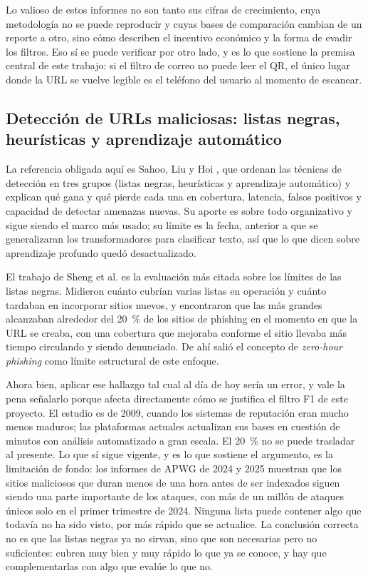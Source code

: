 Lo valioso de estos informes no son tanto sus cifras de crecimiento, cuya
metodología no se puede reproducir y cuyas bases de comparación cambian de un reporte a
otro, sino cómo describen el incentivo económico y la forma de evadir los filtros. Eso
sí se puede verificar por otro lado, y es lo que sostiene la premisa central de este
trabajo: si el filtro de correo no puede leer el QR, el único lugar donde la URL se
vuelve legible es el teléfono del usuario al momento de escanear.

\subsection{Detección de URLs maliciosas: listas negras, heurísticas y aprendizaje automático}

La referencia obligada aquí es Sahoo, Liu y Hoi \cite{sahoo2017malicious}, que
ordenan las técnicas de detección en tres grupos (listas negras, heurísticas y
aprendizaje automático) y explican qué gana y qué pierde cada una en cobertura,
latencia, falsos positivos y capacidad de detectar amenazas nuevas. Su aporte es sobre
todo organizativo y sigue siendo el marco más usado; su límite es la fecha, anterior a
que se generalizaran los transformadores para clasificar texto, así que lo que dicen
sobre aprendizaje profundo quedó desactualizado.

El trabajo de Sheng et al. \cite{sheng2009empirical} es la evaluación más citada
sobre los límites de las listas negras. Midieron cuánto cubrían varias listas en
operación y cuánto tardaban en incorporar sitios nuevos, y encontraron que las más
grandes alcanzaban alrededor del 20~\% de los sitios de phishing en el momento en que
la URL se creaba, con una cobertura que mejoraba conforme el sitio llevaba más tiempo
circulando y siendo denunciado. De ahí salió el concepto de \emph{zero-hour phishing}
como límite estructural de este enfoque.

Ahora bien, aplicar ese hallazgo tal cual al día de hoy sería un error, y vale la
pena señalarlo porque afecta directamente cómo se justifica el filtro F1 de este
proyecto. El estudio es de 2009, cuando los sistemas de reputación eran mucho menos
maduros; las plataformas actuales actualizan sus bases en cuestión de minutos con
análisis automatizado a gran escala. El 20~\% no se puede trasladar al presente. Lo que
sí sigue vigente, y es lo que sostiene el argumento, es la limitación de fondo: los
informes de APWG de 2024 y 2025 \cite{apwg2024q1,apwg2025q1} muestran que los sitios
maliciosos que duran menos de una hora antes de ser indexados siguen siendo una parte
importante de los ataques, con más de un millón de ataques únicos solo en el primer
trimestre de 2024. Ninguna lista puede contener algo que todavía no ha sido visto, por
más rápido que se actualice. La conclusión correcta no es que las listas negras ya no
sirvan, sino que son necesarias pero no suficientes: cubren muy bien y muy rápido lo
que ya se conoce, y hay que complementarlas con algo que evalúe lo que no.

